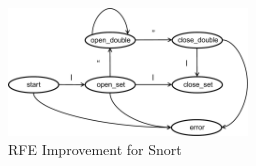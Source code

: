 \begin{figure}[htb]
\centering
\includegraphics[width=2.5in]{figure/cgc-fsm.pdf}
\caption{\footnotesize{RFE Improvement for Snort}}
\label{fig:RFE_Snort}
\end{figure}